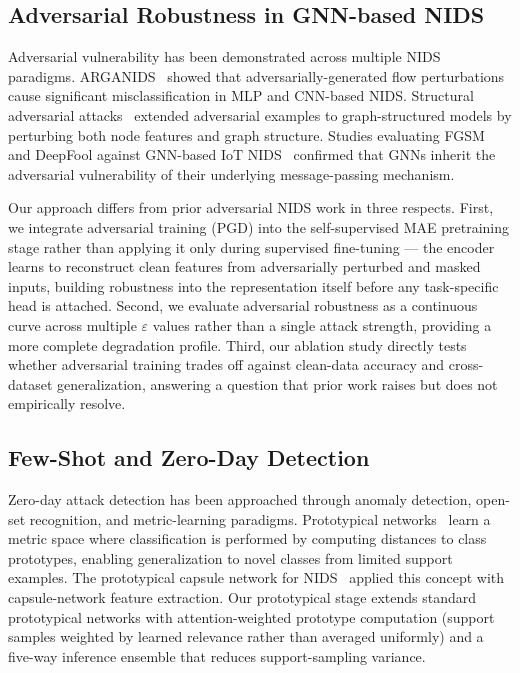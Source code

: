 \documentclass[compsoc,journal]{IEEEtran}
\begin{document}
\subsection{Adversarial Robustness in GNN-based NIDS}

Adversarial vulnerability has been demonstrated across multiple NIDS paradigms. ARGANIDS~\cite{arganids} showed that adversarially-generated flow perturbations cause significant misclassification in MLP and CNN-based NIDS. Structural adversarial attacks~\cite{structuraladv} extended adversarial examples to graph-structured models by perturbing both node features and graph structure. Studies evaluating FGSM and DeepFool against GNN-based IoT NIDS~\cite{iotgnnadv} confirmed that GNNs inherit the adversarial vulnerability of their underlying message-passing mechanism.

Our approach differs from prior adversarial NIDS work in three respects. First, we integrate adversarial training (PGD) into the self-supervised MAE pretraining stage rather than applying it only during supervised fine-tuning — the encoder learns to reconstruct clean features from adversarially perturbed and masked inputs, building robustness into the representation itself before any task-specific head is attached. Second, we evaluate adversarial robustness as a continuous curve across multiple $\varepsilon$ values rather than a single attack strength, providing a more complete degradation profile. Third, our ablation study directly tests whether adversarial training trades off against clean-data accuracy and cross-dataset generalization, answering a question that prior work raises but does not empirically resolve.

\subsection{Few-Shot and Zero-Day Detection}

Zero-day attack detection has been approached through anomaly detection, open-set recognition, and metric-learning paradigms. Prototypical networks~\cite{snell2017prototypical} learn a metric space where classification is performed by computing distances to class prototypes, enabling generalization to novel classes from limited support examples. The prototypical capsule network for NIDS~\cite{protocapsnids} applied this concept with capsule-network feature extraction. Our prototypical stage extends standard prototypical networks with attention-weighted prototype computation (support samples weighted by learned relevance rather than averaged uniformly) and a five-way inference ensemble that reduces support-sampling variance.
\end{document}
